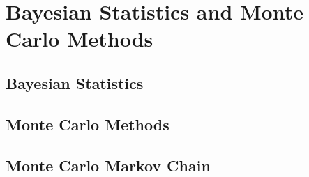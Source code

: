 \chapter{Bayesian Statistics and Monte Carlo Methods}

\section{Bayesian Statistics}

\section{Monte Carlo Methods}

\section{Monte Carlo Markov Chain}